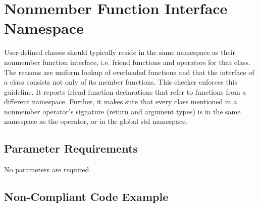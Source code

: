 %
%

\section{Nonmember Function Interface Namespace}
\label{NonmemberFunctionInterfaceNamespace::overview}

User-defined classes should typically reside in the same namespace as their
nonmember function interface, i.e. friend functions and operators for that
class. The reasons are uniform lookup of overloaded functions and that the
interface of a class consists not only of its member functions. This checker
enforces this guideline. It reports friend function declarations that refer to
functions from a different namespace. Further, it makes sure that every class
mentioned in a nonmember operator's signature (return and argument types) is
in the same namespace as the operator, or in the global std namespace.

\subsection{Parameter Requirements}

No parameters are required.

\subsection{Non-Compliant Code Example}

